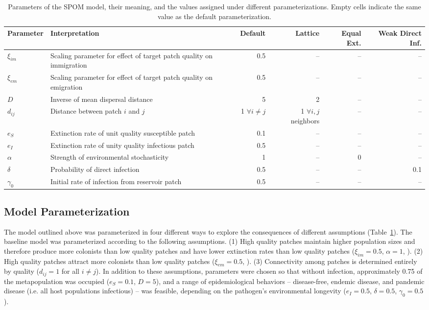 \documentclass{svjour3}
\begin{document}
\begin{table}[h!]   
\caption{Parameters of the SPOM model, their meaning, and the values assigned under different parameterizations.  Empty cells indicate the same value as the default parameterization.}
\begin{tabular}{l p{5cm} rrrr}
Parameter & Interpretation &  Default & Lattice & Equal Ext. & Weak Direct Inf.\\
\hline
$\xi_{im}$ & Scaling parameter for effect of target patch quality on immigration & 0.5 & -- & -- & --\\
$\xi_{em}$ & Scaling parameter for effect of target patch quality on emigration & 0.5 & -- & -- & --\\
$D$& Inverse of mean dispersal distance & 5 & 2 & -- & --\\
$d_{ij}$ & Distance between patch $i$ and $j$ & 1 $\forall i \neq j$ & 1 $\forall i, j$ neighbors & -- & --\\
\hline
$e_S$ & Extinction rate of unit quality susceptible patch & 0.1 & -- & -- & --\\
$e_I$ & Extinction rate of unity quality infectious patch & 0.5 & -- & -- & --\\
$\alpha$ & Strength of environmental stochasticity & 1 & -- & 0 & --\\
\hline
$\delta$ & Probability of direct infection & 0.5 & -- & -- & 0.1\\
$\gamma_0$ & Initial rate of infection from reservoir patch & 0.5 & -- & -- & --
\end{tabular}
\label{params}
\end{table}

\subsection{Model Parameterization}

The model outlined above was parameterized in four different ways to explore the consequences of different assumptions (Table~\ref{params}).  The baseline model was parameterized  according to the following assumptions. (1) High quality patches maintain higher population sizes and therefore produce more colonists than low quality patches and have lower extinction rates than low quality patches ($\xi_{im}=0.5$, $\alpha=1$, \cite{Hanski2003}).  (2) High quality patches attract more colonists than low quality patches ($\xi_{em}=0.5$, \cite{Hanski2003}).  (3)  Connectivity among patches is determined entirely by quality ($d_{ij}=1$ for all $i \neq j$).  In addition to these assumptions, parameters were chosen so that without infection, approximately 0.75 of the metapopulation was occupied ($e_S = 0.1$, $D=5$), and a range of epidemiological behaviors -- disease-free, endemic disease, and pandemic disease (i.e. all host populations infectious) -- was feasible, depending on the pathogen's environmental longevity ($e_I = 0.5$, $\delta = 0.5$, $\gamma_0 = 0.5$). 
\end{document}
